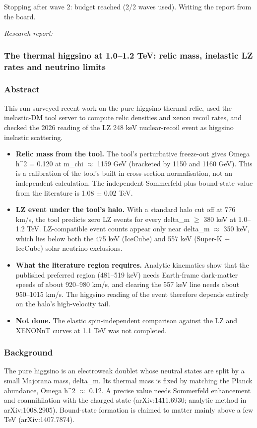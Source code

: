 \documentclass[11pt,a4paper]{article}
\begin{document}
Stopping after wave 2: budget reached (2/2 waves used). Writing the report from the board.

\textit{Research report:}\par
\subsubsection*{The thermal higgsino at 1.0--1.2 TeV: relic mass, inelastic LZ rates and neutrino limits}
\subsubsection*{Abstract}
This run surveyed recent work on the pure-higgsino thermal relic, used the inelastic-DM tool server to compute relic densities and xenon recoil rates, and checked the 2026 reading of the LZ 248 keV nuclear-recoil event as higgsino inelastic scattering.

\begin{itemize}
  \item \textbf{Relic mass from the tool.} The tool's perturbative freeze-out gives Omega h\textasciicircum{}2 = 0.120 at m\_chi $\approx$ 1159 GeV (bracketed by 1150 and 1160 GeV). This is a calibration of the tool's built-in cross-section normalisation, not an independent calculation. The independent Sommerfeld plus bound-state value from the literature is 1.08 $\pm$ 0.02 TeV.
  \item \textbf{LZ event under the tool's halo.} With a standard halo cut off at 776 km/s, the tool predicts zero LZ events for every delta\_m $\geq$ 380 keV at 1.0--1.2 TeV. LZ-compatible event counts appear only near delta\_m $\approx$ 350 keV, which lies below both the 475 keV (IceCube) and 557 keV (Super-K + IceCube) solar-neutrino exclusions.
  \item \textbf{What the literature region requires.} Analytic kinematics show that the published preferred region (481--519 keV) needs Earth-frame dark-matter speeds of about 920--980 km/s, and clearing the 557 keV line needs about 950--1015 km/s. The higgsino reading of the event therefore depends entirely on the halo's high-velocity tail.
  \item \textbf{Not done.} The elastic spin-independent comparison against the LZ and XENONnT curves at 1.1 TeV was not completed.
\end{itemize}
\subsubsection*{Background}
The pure higgsino is an electroweak doublet whose neutral states are split by a small Majorana mass, delta\_m. Its thermal mass is fixed by matching the Planck abundance, Omega h\textasciicircum{}2 $\approx$ 0.12. A precise value needs Sommerfeld enhancement and coannihilation with the charged state (arXiv:1411.6930; analytic method in arXiv:1008.2905). Bound-state formation is claimed to matter mainly above a few TeV (arXiv:1407.7874).
\end{document}
